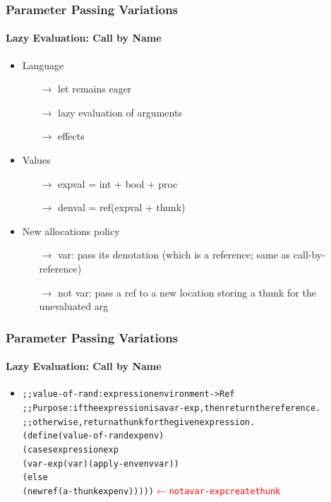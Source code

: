 \documentclass{beamer}
\newcommand{\arrow}{\(\rightarrow\)}
\begin{document}
\begin{frame}[fragile]
\frametitle{Parameter Passing Variations}
\framesubtitle{Lazy Evaluation: Call by Name}
\begin{scriptsize}
\begin{itemize}

\item<1-> Language
\begin{itemize}
  \item[\arrow] let remains eager
  \item[\arrow] lazy evaluation of arguments
  \item[\arrow] effects
\end{itemize}

\item<2-> Values
\begin{itemize}
  \item[\arrow] expval = int + bool + proc
  \item[\arrow] denval = ref(expval + thunk)
\end{itemize}

\item<3-> New allocations policy
\begin{itemize}
  \item[\arrow] var: pass its denotation (which is a reference; same as call-by-reference)
  \item[\arrow] not var: pass a ref to a new location storing a thunk for the unevaluated arg
\end{itemize}

\end{itemize}
\end{scriptsize}
\end{frame}

\begin{frame}[fragile]
\frametitle{Parameter Passing Variations}
\framesubtitle{Lazy Evaluation: Call by Name}
\begin{scriptsize}
\begin{itemize}
\item<1->
\begin{alltt}
;; value-of-rand : expression environment -> Ref
;; Purpose: if the expression is a var-exp, then return the reference.
;; otherwise,return a thunk for the given expression.
(define (value-of-rand exp env)
  (cases expression exp
    (var-exp (var) (apply-env env var))
    (else
     (newref (a-thunk exp env))))) \textcolor{red}{\(\leftarrow\) not a var-exp create thunk}
\end{alltt}

\end{itemize}
\end{scriptsize}
\end{frame}
\end{document}
